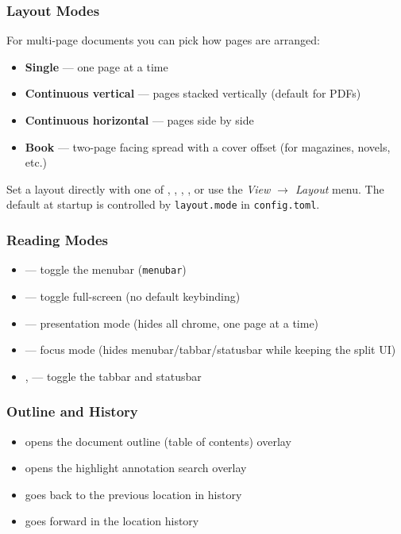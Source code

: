 \documentclass[a4paper,12pt]{article}
\begin{document}
\subsubsection{Layout Modes}

For multi-page documents you can pick how pages are arranged:
\begin{itemize}[leftmargin=*]
    \item \textbf{Single} — one page at a time
    \item \textbf{Continuous vertical} — pages stacked vertically (default for PDFs)
    \item \textbf{Continuous horizontal} — pages side by side
    \item \textbf{Book} — two-page facing spread with a cover offset (for magazines, novels, etc.)
\end{itemize}

Set a layout directly with one of , , , , or use the \textit{View $\to$ Layout} menu. The default at startup is controlled by \texttt{layout.\allowbreak{}mode} in \texttt{config.\allowbreak{}toml}.

\subsubsection{Reading Modes}
\begin{itemize}[leftmargin=*]
    \item {} — toggle the menubar (\texttt{menubar})
    \item {} — toggle full-screen (no default keybinding)
    \item {} — presentation mode (hides all chrome, one page at a time)
    \item {} — focus mode (hides menubar/tabbar/statusbar while keeping the split UI)
    \item {},  — toggle the tabbar and statusbar
\end{itemize}

\subsubsection{Outline and History}
\begin{itemize}[leftmargin=*]
    \item {} opens the document outline (table of contents) overlay
    \item {} opens the highlight annotation search overlay
    \item {} goes back to the previous location in history
    \item {} goes forward in the location history
\end{itemize}
\end{document}
